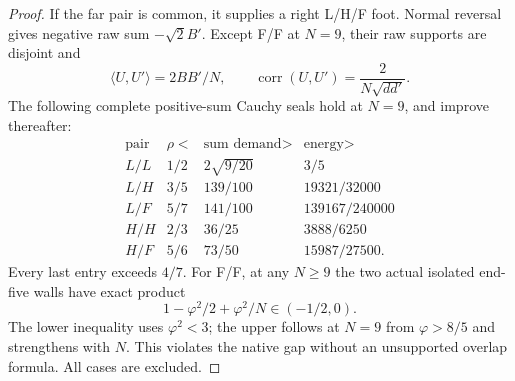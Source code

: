 \documentclass[11pt]{article}
\theoremstyle{definition}
\theoremstyle{remark}
\newcommand{\ip}[2]{\langle #1,#2\rangle}
\begin{document}
\begin{proof}
If the far pair is common, it supplies a right L/H/F
foot. Normal reversal gives negative raw sum
\(-\sqrt2B'\). Except F/F at \(N=9\), their raw
supports are disjoint and
\[
 \ip{U}{U'}=2BB'/N,\qquad
 \operatorname{corr}(U,U')=\frac{2}{N\sqrt{dd'}}.
\]
The following complete positive-sum Cauchy seals hold
at \(N=9\), and improve thereafter:
\[
\begin{array}{c|c|c|c}
\text{pair}&\rho<&\text{sum demand}>&\text{energy}>\\ \hline
L/L&1/2&2\sqrt{9/20}&3/5\\
L/H&3/5&139/100&19321/32000\\
L/F&5/7&141/100&139167/240000\\
H/H&2/3&36/25&3888/6250\\
H/F&5/6&73/50&15987/27500.
\end{array}
\]
Every last entry exceeds \(4/7\).
For F/F, at any \(N\geq9\) the two actual isolated
end-five walls have exact product
\[
 1-\varphi^2/2+\varphi^2/N\in(-1/2,0).
\]
The lower inequality uses \(\varphi^2<3\);
the upper follows at \(N=9\) from \(\varphi>8/5\)
and strengthens with \(N\).
This violates the native gap without an unsupported
overlap formula. All cases are excluded.
\end{proof}
\end{document}
